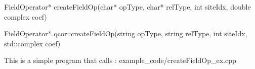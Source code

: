 
\begin{apidefinition}

\begin{Csynopsis}
    FieldOperator* createFieldOp(char* opType, char* relType, int siteIdx, double complex coef)
\end{Csynopsis}

\begin{Cppsynopsis}
    FieldOperator* qcor::createFieldOp(string opType, string relType, int siteIdx, std::complex coef)
\end{Cppsynopsis}


\begin{apiarguments}
\end{apiarguments}

\apidescription{
        
}

\apireturnvalues{
    
}      

\apinotes{
    
}

\begin{apiexamples}

\apicppexample
    { This is a simple program that calls : } 
    { example_code/createFieldOp_ex.cpp} 
    {}

\end{apiexamples}

\end{apidefinition}
